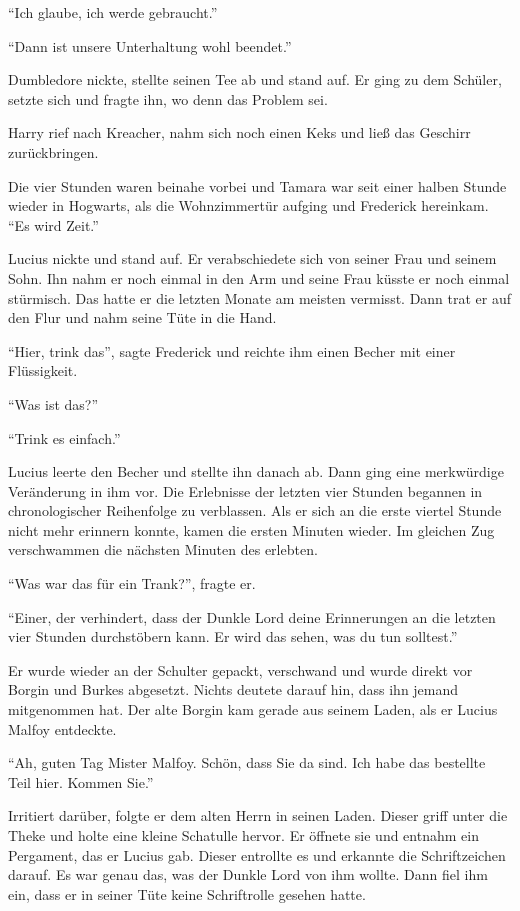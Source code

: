 \enquote{Ich glaube, ich werde gebraucht.}

\enquote{Dann ist unsere Unterhaltung wohl beendet.}

Dumbledore nickte, stellte seinen Tee ab und stand auf. Er ging zu dem Schüler, setzte sich und fragte ihn, wo denn das Problem sei.

Harry rief nach Kreacher, nahm sich noch einen Keks und ließ das Geschirr zurückbringen.

\trenn

Die vier Stunden waren beinahe vorbei und Tamara war seit einer halben Stunde wieder in Hogwarts, als die Wohnzimmertür aufging und Frederick hereinkam. \enquote{Es wird Zeit.}

Lucius nickte und stand auf. Er verabschiedete sich von seiner Frau und seinem Sohn. Ihn nahm er noch einmal in den Arm und seine Frau küsste er noch einmal stürmisch. Das hatte er die letzten Monate am meisten vermisst. Dann trat er auf den Flur und nahm seine Tüte in die Hand.

\enquote{Hier, trink das}, sagte Frederick und reichte ihm einen Becher mit einer Flüssigkeit.

\enquote{Was ist das?}

\enquote{Trink es einfach.}

Lucius leerte den Becher und stellte ihn danach ab. Dann ging eine merkwürdige Veränderung in ihm vor. Die Erlebnisse der letzten vier Stunden begannen in chronologischer Reihenfolge zu verblassen. Als er sich an die erste viertel Stunde nicht mehr erinnern konnte, kamen die ersten Minuten wieder. Im gleichen Zug verschwammen die nächsten Minuten des erlebten.

\enquote{Was war das für ein Trank?}, fragte er.

\enquote{Einer, der verhindert, dass der Dunkle Lord deine Erinnerungen an die letzten vier Stunden durchstöbern kann. Er wird das sehen, was du tun solltest.}

Er wurde wieder an der Schulter gepackt, verschwand und wurde direkt vor Borgin und Burkes abgesetzt. Nichts deutete darauf hin, dass ihn jemand mitgenommen hat. Der alte Borgin kam gerade aus seinem Laden, als er Lucius Malfoy entdeckte.

\enquote{Ah, guten Tag Mister Malfoy. Schön, dass Sie da sind. Ich habe das bestellte Teil hier. Kommen Sie.}

Irritiert darüber, folgte er dem alten Herrn in seinen Laden. Dieser griff unter die Theke und holte eine kleine Schatulle hervor. Er öffnete sie und entnahm ein Pergament, das er Lucius gab. Dieser entrollte es und erkannte die Schriftzeichen darauf. Es war genau das, was der Dunkle Lord von ihm wollte. Dann fiel ihm ein, dass er in seiner Tüte keine Schriftrolle gesehen hatte.

